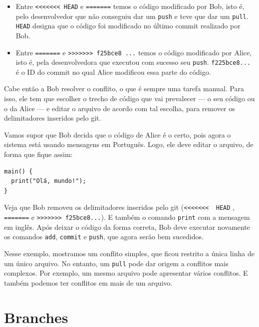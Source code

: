 \documentclass[
  11pt,
  twoside]{book}
\newcommand{\passthrough}[1]{#1}
\begin{document}
\begin{itemize}
\item
  Entre \passthrough{\lstinline!<<<<<<< HEAD!} e
  \passthrough{\lstinline!=======!} temos o código modificado por Bob,
  isto é, pelo desenvolvedor que não conseguiu dar um
  \passthrough{\lstinline!push!} e teve que dar um
  \passthrough{\lstinline!pull!}. \passthrough{\lstinline!HEAD!} designa
  que o código foi modificado no último commit realizado por Bob.
\item
  Entre \passthrough{\lstinline!=======!} e
  \passthrough{\lstinline!>>>>>>> f25bce8 ...!} temos o código
  modificado por Alice, isto é, pela desenvolvedora que executou com
  sucesso seu \passthrough{\lstinline!push!}.
  \passthrough{\lstinline!f225bce8...!} é o ID do commit no qual Alice
  modificou essa parte do código.
\end{itemize}

Cabe então a Bob resolver o conflito, o que é sempre uma tarefa manual.
Para isso, ele tem que escolher o trecho de código que vai prevalecer
--- o seu código ou o da Alice --- e editar o arquivo de acordo com tal
escolha, para remover os delimitadores inseridos pelo git.

Vamos supor que Bob decida que o código de Alice é o certo, pois agora o
sistema está usando mensagens em Português. Logo, ele deve editar o
arquivo, de forma que fique assim:

\begin{lstlisting}
main() {                
  print("Olá, mundo!");                      
}                       
\end{lstlisting}

Veja que Bob removeu os delimitadores inseridos pelo git
(\passthrough{\lstinline!<<<<<<<  HEAD!} ,
\passthrough{\lstinline!=======!} e
\passthrough{\lstinline!>>>>>>> f25bce8...!}). E também o comando
\passthrough{\lstinline!print!} com a mensagem em inglês. Após deixar o
código da forma correta, Bob deve executar novamente os comandos
\passthrough{\lstinline!add!}, \passthrough{\lstinline!commit!} e
\passthrough{\lstinline!push!}, que agora serão bem sucedidos.

Nesse exemplo, mostramos um conflito simples, que ficou restrito a única
linha de um único arquivo. No entanto, um \passthrough{\lstinline!pull!}
pode dar origem a conflitos mais complexos. Por exemplo, um mesmo
arquivo pode apresentar vários conflitos. E também podemos ter conflitos
em mais de um arquivo.

\hypertarget{branches}{%
\section{Branches}\label{branches}}
\end{document}
